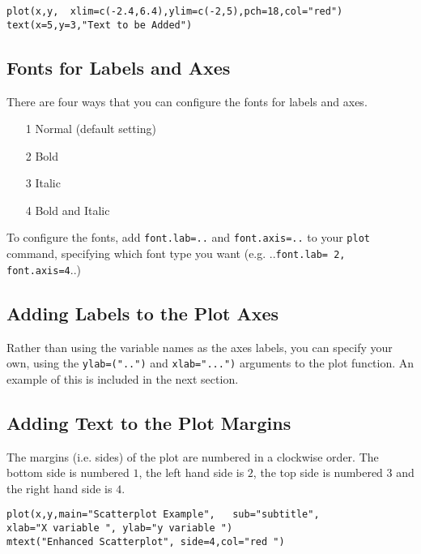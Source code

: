 \begin{framed}
\begin{verbatim}
plot(x,y,  xlim=c(-2.4,6.4),ylim=c(-2,5),pch=18,col="red")
text(x=5,y=3,"Text to be Added")
\end{verbatim}
\end{framed}





\subsection{Fonts for Labels and Axes}
There are four ways that you can configure the fonts for labels and axes.

\begin{itemize}
\item[1] Normal (default setting)
\item[2] Bold
\item[3] Italic
\item[4] Bold and Italic
\end{itemize}

To configure the fonts, add \texttt{font.lab=..} and \texttt{font.axis=..} to your \texttt{plot} command, specifying which font type you want (e.g. ..\texttt{font.lab= 2, font.axis=4}..)

\subsection{Adding Labels to the Plot Axes}
Rather than using the variable names as the axes labels, you can specify your own, using the \texttt{ylab=("..")} and \texttt{xlab="...")} arguments to the plot function. An example of this is included in the next section.
\subsection{Adding Text to the Plot Margins}

The margins (i.e. sides) of the plot are numbered in a clockwise order. The bottom side is numbered $1$, the left hand side is $2$, the top side is numbered $3$ and the right hand side is $4$.

\begin{framed}
\begin{verbatim}
plot(x,y,main="Scatterplot Example",   sub="subtitle",    
xlab="X variable ", ylab="y variable ")	
mtext("Enhanced Scatterplot", side=4,col="red ")
\end{verbatim}
\end{framed}





